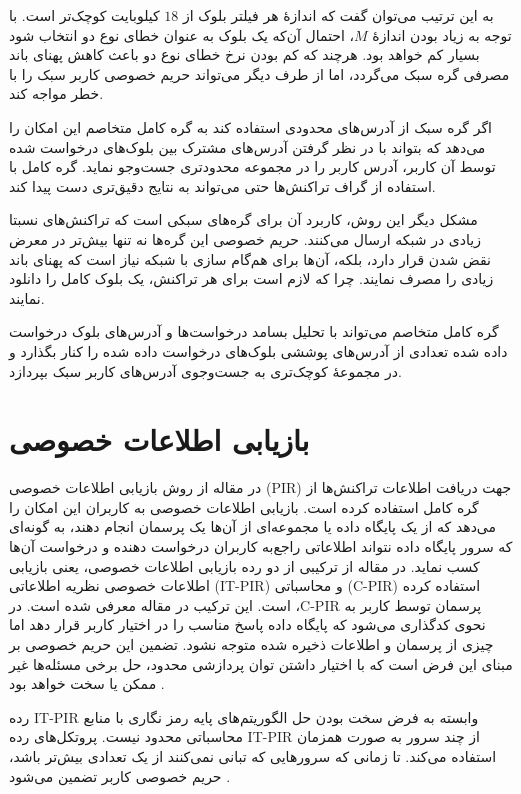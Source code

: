 به این ترتیب می‌توان گفت که اندازهٔ هر فیلتر بلوک از $18$ کیلوبایت کوچک‌تر است. با توجه به زیاد بودن اندازهٔ $M$، احتمال آن‌که یک بلوک به عنوان خطای نوع دو انتخاب شود بسیار کم خواهد بود. هرچند که کم بودن نرخ خطای نوع دو باعث کاهش پهنای باند مصرفی گره سبک می‌گردد، اما از طرف دیگر می‌تواند حریم خصوصی کاربر سبک را با خطر مواجه کند.

اگر گره سبک از آدرس‌های محدودی استفاده کند به گره کامل متخاصم این امکان را می‌دهد که بتواند با در نظر گرفتن آدرس‌های مشترک بین بلوک‌های درخواست شده توسط آن کاربر، آدرس کاربر را در مجموعه محدود‌تری جست‌وجو نماید. گره کامل با استفاده از گراف تراکنش‌ها حتی می‌تواند به نتایج دقیق‌تری دست پیدا کند\cite{blockfilter-wiki}.

مشکل دیگر این روش، کاربرد آن برای گره‌های سبکی است که تراکنش‌های نسبتا زیادی در شبکه ارسال می‌کنند. حریم خصوصی این گره‌ها نه تنها بیش‌تر در معرض نقض شدن قرار دارد، بلکه، آن‌ها برای هم‌گام سازی با شبکه نیاز است که پهنای باند زیادی را مصرف نمایند. چرا که لازم است برای هر تراکنش، یک بلوک کامل را دانلود نمایند.

گره کامل متخاصم می‌تواند با تحلیل‌ بسامد درخواست‌ها و آدرس‌های بلوک درخواست داده شده تعدادی از آدرس‌های پوششی بلوک‌های درخواست داده شده را کنار بگذارد و در مجموعهٔ کوچک‌تری به جست‌و‌جوی آدرس‌‌های کاربر سبک بپردازد.

\section{بازیابی اطلاعات خصوصی}
\label{PIR}
در مقاله \cite{Qin2019} از روش بازیابی اطلاعات خصوصی (PIR) جهت دریافت اطلاعات تراکنش‌ها از گره‌ کامل استفاده کرده است. بازیابی اطلاعات خصوصی به کاربران این امکان را می‌دهد که از یک پایگاه داده یا مجموعه‌ای از آن‌ها یک پرسمان انجام دهند، به گونه‌ای که سرور پایگاه داده نتواند اطلاعاتی راجع‌به کاربران درخواست دهنده و درخواست آن‌ها کسب نماید. در مقاله \cite{Qin2019}  از ترکیبی از دو رده بازیابی اطلاعات خصوصی، یعنی بازیابی اطلاعات خصوصی نظریه اطلاعاتی (IT-PIR) و محاسباتی (C-PIR) استفاده کرده است. این ترکیب در مقاله \cite{Devet2014} معرفی شده است. در ،C-PIR پرسمان توسط کاربر به نحوی کدگذاری می‌شود که پایگاه داده پاسخ مناسب را در اختیار کاربر قرار دهد اما چیزی از پرسمان و اطلاعات ذخیره شده متوجه نشود. تضمین این حریم خصوصی بر مبنای این فرض است که با اختیار داشتن توان پردازشی محدود، حل برخی مسئله‌ها  غیر ممکن یا سخت خواهد بود \cite{Devet2014}.

رده IT-PIR وابسته به فرض سخت بودن حل الگوریتم‌های پایه رمز نگاری با منابع محاسباتی محدود نیست. پروتکل‌های رده IT-PIR از چند سرور به صورت همزمان استفاده می‌کند. تا زمانی که سرورهایی که تبانی نمی‌کنند از یک تعدادی بیش‌تر باشد، حریم خصوصی کاربر تضمین می‌شود \cite{Devet2014}. 

